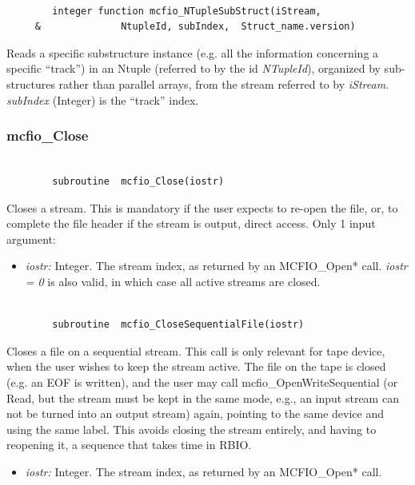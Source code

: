 \begin{verbatim}

        integer function mcfio_NTupleSubStruct(iStream,
     &              NtupleId, subIndex,  Struct_name.version)

\end{verbatim}

Reads a specific substructure instance (e.g. all the information concerning a
specific ``track'')  in an Ntuple (referred to by the id {\em NTupleId}), organized
by sub-structures rather than parallel arrays, from the stream referred to by {\em
iStream}.  {\em subIndex} (Integer) is the ``track'' index.




\subsubsection{mcfio\_Close}

\begin{verbatim}

        subroutine  mcfio_Close(iostr)

\end{verbatim}

Closes a stream. This is mandatory if the user expects to re-open the  file,
or, to complete the file header if the stream is output, direct access. Only
1 input argument:
\begin{itemize}
\item {\em iostr:} Integer. The stream index, as returned by an MCFIO\_Open*
call. {\em iostr = 0} is also valid, in which case all active streams are
closed.
\end{itemize}


\begin{verbatim}

        subroutine  mcfio_CloseSequentialFile(iostr)

\end{verbatim}

Closes a file on a sequential stream. This call is only relevant for
tape device, when the user wishes to keep the stream active. The file
on the tape is closed (e.g. an EOF is written), and the user may call
mcfio\_OpenWriteSequential (or Read, but the stream must be kept in the
same mode, e.g., an input stream can not be turned into an output stream)
again, pointing to the same device and using the same label. This avoids
closing the stream entirely, and having to reopening it, a sequence
that takes time in RBIO.
\begin{itemize}
\item {\em iostr:} Integer. The stream index, as returned by an MCFIO\_Open*
call.
\end{itemize}


